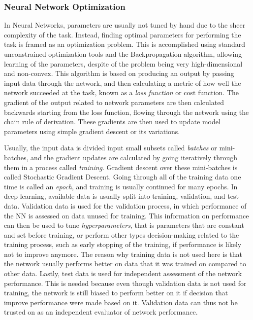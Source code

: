 \subsubsection*{Neural Network Optimization}

In Neural Networks, parameters are usually not tuned by hand due to the sheer complexity of the task. Instead, finding optimal parameters for performing the task is framed as an optimization problem. This is accomplished using standard unconstrained optimization tools and the Backpropagation algorithm, allowing learning of the parameters, despite of the problem being very high-dimensional and non-convex. This algorithm is based on producing an output by passing input data through the network, and then calculating a metric of how well the network succeeded at the task, known as a \textit{loss function} or cost function. The gradient of the output related to network parameters are then calculated backwards starting from the loss function, flowing through the network using the chain rule of derivation. These gradients are then used to update model parameters using simple gradient descent or its variations. 

Usually, the input data is divided input small subsets called \textit{batches} or mini-batches, and the gradient updates are calculated by going iteratively through them in a process called \textit{training}. Gradient descent over these mini-batches is called Stochastic Gradient Descent. Going through all of the training data one time is called an \textit{epoch}, and training is usually continued for many epochs. In deep learning, available data is usually split into training, validation, and test data. Validation data is used for the validation process, in which performance of the NN is assessed on data unused for training. This information on performance can then be used to tune \textit{hyperparameters}, that is parameters that are constant and set before training, or perform other types decision-making related to the training process, such as early stopping of the training, if performance is likely not to improve anymore. The reason why training data is not used here is that the network usually performs better on data that it was trained on compared to other data. Lastly, test data is used for independent assessment of the network performance. This is needed because even though validation data is not used for training, the network is still biased to perform better on it if decision that improve performance were made based on it. Validation data can thus not be trusted on as an independent evaluator of network performance. 

